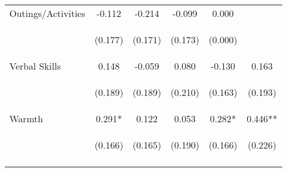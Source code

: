 \begin{tabular}{lccccc}
\noalign{\smallskip}Outings/Activities & -0.112 & -0.214 & -0.099 & 0.000 & \\
 & \begin{footnotesize}(0.177)\end{footnotesize} & \begin{footnotesize}(0.171)\end{footnotesize} & \begin{footnotesize}(0.173)\end{footnotesize} & \begin{footnotesize}(0.000)\end{footnotesize} & \begin{footnotesize}\end{footnotesize}\\
\noalign{\smallskip}Verbal Skills & 0.148 & -0.059 & 0.080 & -0.130 & 0.163\\
 & \begin{footnotesize}(0.189)\end{footnotesize} & \begin{footnotesize}(0.189)\end{footnotesize} & \begin{footnotesize}(0.210)\end{footnotesize} & \begin{footnotesize}(0.163)\end{footnotesize} & \begin{footnotesize}(0.193)\end{footnotesize}\\
\noalign{\smallskip}Warmth & 0.291* & 0.122 & 0.053 & 0.282* & 0.446**\\
 & \begin{footnotesize}(0.166)\end{footnotesize} & \begin{footnotesize}(0.165)\end{footnotesize} & \begin{footnotesize}(0.190)\end{footnotesize} & \begin{footnotesize}(0.166)\end{footnotesize} & \begin{footnotesize}(0.226)\end{footnotesize}\\
\noalign{\smallskip}\hline\end{tabular}\\
